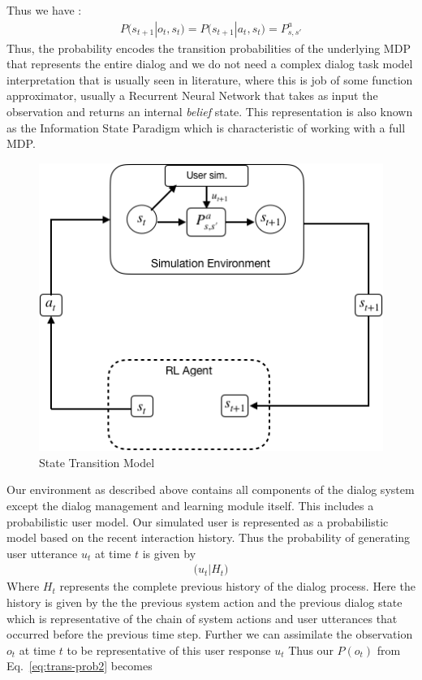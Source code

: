 \documentclass[12pt]{extarticle}
\numberwithin{equation}{section}
\begin{document}
	Thus we have :
	\begin{align}\label{eq:trans-prob2}
	P\big(s_{t+1}|o_t, s_t\big)
	= P\big(s_{t+1} | a_t, s_t\big) = P_{s,s'}^a
	\end{align}
	Thus, the probability encodes the transition probabilities of the underlying MDP that represents the entire dialog and we do not need a complex dialog task model interpretation that is usually seen in literature, where this is job of some function approximator, usually a Recurrent Neural Network that takes as input the observation and returns an internal \textit{belief} state. This representation is also known as the Information State Paradigm \cite{Larsson:2000:ISD:973935.973943} which is characteristic of working with a full MDP.
	\begin{figure}[h]
		\centering
		\includegraphics[scale=0.7]{state-trans}
		\caption{State Transition Model
			\label{state-trans}}
	\end{figure}
	Our environment as described above contains all components of the dialog system except the dialog management and learning module itself. This includes a probabilistic user model. Our simulated user is represented as a probabilistic model based on the recent interaction history. Thus the probability of generating user utterance $u_t$ at time $t$ is given by 
	\begin{align}
	\big(u_t | H_t\big)
	\end{align}
	Where $H_t$ represents the complete previous history of the dialog process. Here the history is given by the the previous system action and the previous dialog state which is representative of the chain of system actions and user utterances that occurred before the previous time step. Further we can assimilate the observation $o_t$ at time $t$ to be representative of this user response $u_t$ Thus our $P(o_t)$ from Eq.\ \ref{eq:trans-prob2} becomes
\end{document}
